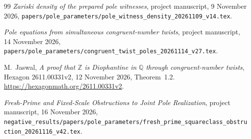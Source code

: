 \documentclass[11pt,a4paper]{article}
\theoremstyle{definition}\newtheorem{definition}[theorem]{Definition}
\theoremstyle{remark}\newtheorem{remark}[theorem]{Remark}
\newcommand{\Q}{\mathbb Q}\newcommand{\Z}{\mathbb Z}
\begin{document}
\begin{thebibliography}{99}
 \emph{Zariski density of the prepared pole witnesses},
project manuscript, 9 November 2026,
\nolinkurl{papers/pole_parameters/pole_witness_density_20261109_v14.tex}.

 \emph{Pole equations from simultaneous congruent-number twists},
project manuscript, 14 November 2026,
\nolinkurl{papers/pole_parameters/congruent_twist_poles_20261114_v27.tex}.

 M.~Jaswal, \emph{A proof that $\Z$ is Diophantine in $\Q$
through congruent-number twists}, Hexagon 2611.00331v2,
12 November 2026, Theorem~1.2.
\url{https://hexagonmath.org/2611.00331v2}.

\emph{Fresh-Prime and Fixed-Scale Obstructions to Joint Pole Realization},
project manuscript, 16 November 2026,
\nolinkurl{negative_results/papers/pole_parameters/fresh_prime_squareclass_obstruction_20261116_v42.tex}.
\end{thebibliography}
\end{document}
